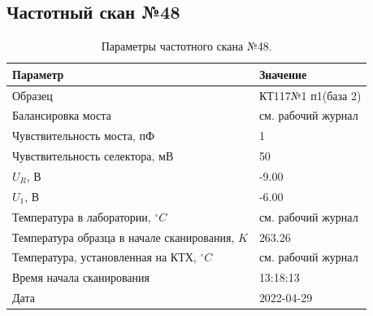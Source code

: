\subsection{Частотный скан №48}
\begin{table}[!ht]
    \centering
    \caption{Параметры частотного скана №48.}
    \begin{tabular}{|l|l|}
        \hline
        Параметр                                       & Значение                  \\ \hline
        Образец                                        & КТ117№1 п1(база 2)        \\ \hline
        Балансировка моста                             & см. рабочий журнал        \\ \hline
        Чувствительность моста, пФ                     & 1                         \\ \hline
        Чувствительность селектора, мВ                 & 50                        \\ \hline
        $U_R$, В                                       & -9.00                     \\ \hline
        $U_1$, В                                       & -6.00                     \\ \hline
        Температура в лаборатории, $^\circ C$          & см. рабочий журнал        \\ \hline
        Температура образца в начале сканирования, $K$ & 263.26                    \\ \hline
        Температура, установленная на КТХ, $^\circ C$  & см. рабочий журнал        \\ \hline
        Время начала сканирования                      & 13:18:13                  \\ \hline
        Дата                                           & 2022-04-29                \\ \hline
    \end{tabular}
    \label{table:frequency_scan_48}
\end{table}

